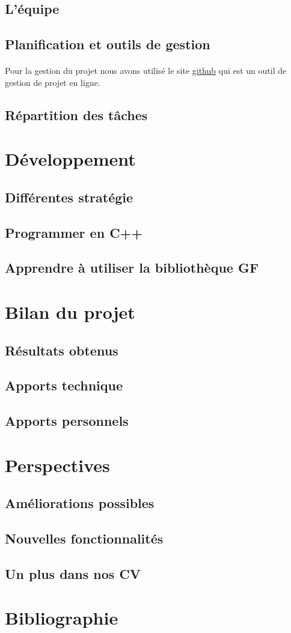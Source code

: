 \documentclass[12pt]{report}
\begin{document}
\subsection{L'équipe}
\subsection{Planification et outils de gestion}

\paragraph{}
Pour la gestion du projet nous avons utilisé le site 
\href{https://github.com/}{github} qui est un outil de gestion 
de projet en ligne.

\subsection{Répartition des tâches}

\section{Développement}
\subsection{Différentes stratégie}
\subsection{Programmer en C++}
\subsection{Apprendre à utiliser la bibliothèque GF}

\section{Bilan du projet}
\subsection{Résultats obtenus}
\subsection{Apports technique}
\subsection{Apports personnels}

\section{Perspectives}
\subsection{Améliorations possibles}
\subsection{Nouvelles fonctionnalités}
\subsection{Un plus dans nos CV}

\section{Bibliographie}
\end{document}
